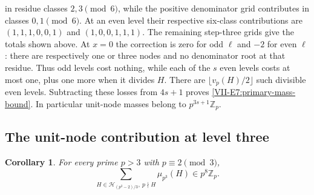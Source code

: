 \documentclass[11pt,letterpaper]{article}
\newtheorem{corollary}[theorem]{Corollary}
\numberwithin{equation}{section}
\begin{document}
in residue classes $2,3\pmod6$, while the positive denominator grid
contributes in classes $0,1\pmod6$. At an even level their respective
six-class contributions are $(1,1,1,0,0,1)$ and $(1,0,0,1,1,1)$.
The remaining step-three grids give the totals shown above.
At $x=0$ the correction is zero for odd $\ell$ and $-2$ for even
$\ell$: there are respectively one or three nodes and no denominator
root at that residue. Thus odd levels cost nothing, while each of the
$s$ even levels costs at most one, plus one more when it divides $H$.
There are $\lfloor v_p(H)/2\rfloor$ such divisible even levels.
Subtracting these losses from $4s+1$ proves
\eqref{VII-E7:primary-mass-bound}. In particular unit-node masses belong
to $p^{3s+1}\mathbb Z_p$.

\subsection{The unit-node contribution at level three}
\begin{corollary}\label{VII-E7:primary-unit-r3}
For every prime $p>3$ with $p\equiv2\pmod3$,
\[
 \sum_{H\in\mathcal H_{(p^3-2)/3},\ p\nmid H}\mu_{p^3}(H)
 \in p^8\mathbb Z_p.
\]
\end{corollary}
\end{document}
